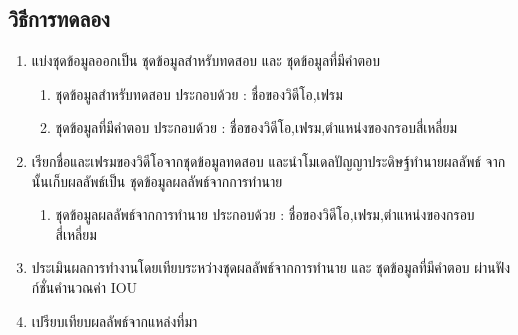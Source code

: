 \subsection*{วิธีการทดลอง}
	\begin{enumerate}
		\item แบ่งชุดข้อมูลออกเป็น ชุดข้อมูลสำหรับทดสอบ และ ชุดข้อมูลที่มีคำตอบ
			\begin{enumerate}
				\item ชุดข้อมูลสำหรับทดสอบ ประกอบด้วย : ชื่อของวิดีโอ,เฟรม
				\item ชุดข้อมูลที่มีคำตอบ ประกอบด้วย : ชื่อของวิดีโอ,เฟรม,ตำแหน่งของกรอบสี่เหลี่ยม
			\end{enumerate}
		\item เรียกชื่อและเฟรมของวิดีโอจากชุดข้อมูลทดสอบ และนำโมเดลปัญญาประดิษฐ์ทำนายผลลัพธ์ จากนั้นเก็บผลลัพธ์เป็น ชุดข้อมูลผลลัพธ์จากการทำนาย
			\begin{enumerate}
				\item ชุดข้อมูลผลลัพธ์จากการทำนาย ประกอบด้วย : ชื่อของวิดีโอ,เฟรม,ตำแหน่งของกรอบสี่เหลี่ยม
			\end{enumerate}
		\item ประเมินผลการทำงานโดยเทียบระหว่างชุดผลลัพธ์จากการทำนาย และ ชุดข้อมูลที่มีคำตอบ ผ่านฟังก์ชั่นคำนวณค่า IOU		
		\item เปรียบเทียบผลลัพธ์จากแหล่งที่มา
\end{enumerate}
